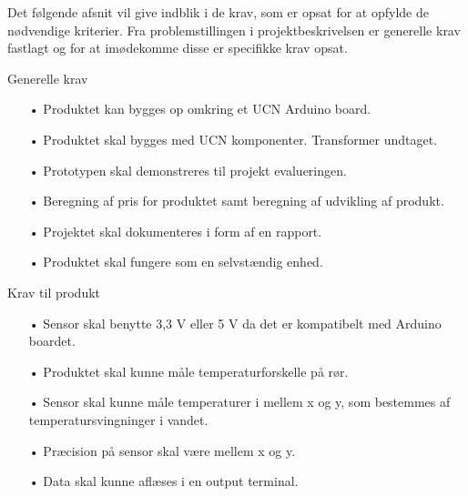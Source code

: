 Det følgende afsnit vil give indblik i de krav, som er opsat for at opfylde de nødvendige kriterier. Fra problemstillingen i projektbeskrivelsen er generelle krav fastlagt og for at imødekomme disse er specifikke krav opsat.  

\hfill \break
Generelle krav
\begin{enumerate}
	\item[•]Produktet kan bygges op omkring et UCN Arduino board. 
	\item[•]Produktet skal bygges med UCN komponenter. Transformer undtaget.
	\item[•]Prototypen skal demonstreres til projekt evalueringen. 
	\item[•]Beregning af pris for produktet samt beregning af udvikling af       produkt.
	\item[•]Projektet skal dokumenteres i form af en rapport.
	\item[•]Produktet skal fungere som en selvstændig enhed.
\end{enumerate}	

Krav til produkt
\begin{enumerate}
	\item[•]Sensor skal benytte 3,3 V eller 5 V da det er kompatibelt med Arduino boardet.
	\item[•]Produktet skal kunne måle temperaturforskelle på rør.
	\item[•]Sensor skal kunne måle temperaturer i mellem x og y, som bestemmes af temperatursvingninger i vandet.
	\item[•]Præcision på sensor skal være mellem x og y.
	\item[•]Data skal kunne aflæses i en output terminal.
\end{enumerate}	
	